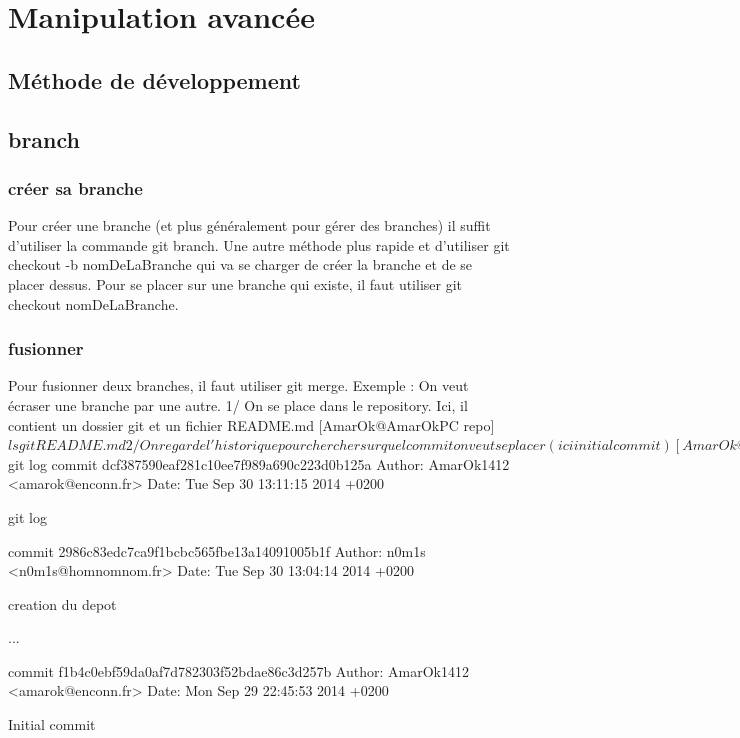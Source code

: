 \documentclass[a4paper,10pt]{report}
\begin{document}
\chapter{Manipulation avancée}
  \section{Méthode de développement}
  \section{branch}
     \subsection{créer sa branche}
     Pour créer une branche (et plus généralement pour gérer des branches) il suffit d'utiliser la commande git branch. Une autre méthode plus rapide et d'utiliser git checkout -b nomDeLaBranche qui va se charger de créer la branche et de se placer dessus. Pour se placer sur une branche qui existe, il faut utiliser git checkout nomDeLaBranche.
     \subsection{fusionner}
     Pour fusionner deux branches, il faut utiliser git merge.
     Exemple : On veut écraser une branche par une autre.
     1/ On se place dans le repository. Ici, il contient un dossier git et un fichier README.md
     [AmarOk@AmarOkPC repo]$ ls
git  README.md
     2/ On regarde l'historique pour chercher sur quel commit on veut se placer (ici initial commit)
[AmarOk@AmarOkPC repo]$ git log
commit dcf387590eaf281c10ee7f989a690c223d0b125a
Author: AmarOk1412 <amarok@enconn.fr>
Date:   Tue Sep 30 13:11:15 2014 +0200

    git log

commit 2986c83edc7ca9f1bcbc565fbe13a14091005b1f
Author: n0m1s <n0m1s@homnomnom.fr>
Date:   Tue Sep 30 13:04:14 2014 +0200

    creation du depot

...

commit f1b4c0ebf59da0af7d782303f52bdae86c3d257b
Author: AmarOk1412 <amarok@enconn.fr>
Date:   Mon Sep 29 22:45:53 2014 +0200

    Initial commit
    
\end{document}
